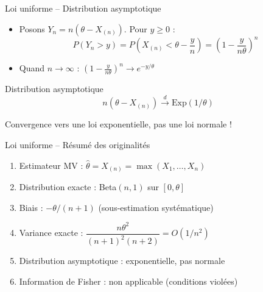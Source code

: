 \documentclass[11pt,aspectratio=169]{beamer}
\begin{document}
\begin{frame}{Loi uniforme -- Distribution asymptotique}

\begin{itemize}

\item Posons $Y_n = n(\theta - X_{(n)})$. Pour $y \geq 0$ :
  \[
  P(Y_n > y) = P\left(X_{(n)} < \theta - \frac{y}{n}\right) = \left(1 - \frac{y}{n\theta}\right)^n
  \]

\item Quand $n \to \infty$ : $\left(1 - \frac{y}{n\theta}\right)^n \to e^{-y/\theta}$

\end{itemize}

\medskip

\begin{alertblock}{Distribution asymptotique}
\[
\boxed{n(\theta - X_{(n)}) \xrightarrow{d} \text{Exp}(1/\theta)}
\]
\end{alertblock}

\medskip

Convergence vers une loi exponentielle, pas une loi normale !

\end{frame}

\begin{frame}{Loi uniforme -- Résumé des originalités}

\begin{enumerate}

\item Estimateur MV : $\hat{\theta} = X_{(n)} = \max(X_1, \ldots, X_n)$\newline

\item Distribution exacte : Beta$(n,1)$ sur $[0,\theta]$\newline

\item Biais : $-\theta/(n+1)$ (sous-estimation systématique)\newline

\item Variance exacte : $\dfrac{n\theta^2}{(n+1)^2(n+2)} = O(1/n^2)$\newline

\item Distribution asymptotique : exponentielle, pas normale\newline

\item Information de Fisher : non applicable (conditions violées)

\end{enumerate}

\end{frame}
\end{document}
